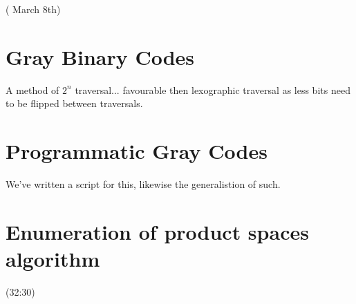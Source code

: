 \documentclass{article}
\begin{document}
( March 8th)
\section{Gray Binary Codes}
A method of $2^n$ traversal... favourable then lexographic traversal as less bits need to be flipped between traversals.

\section{Programmatic Gray Codes}
We've written a script for this, likewise the generalistion of such.

\subsection*{
}
\section{Enumeration of product spaces algorithm}
(32:30)
\end{document}
